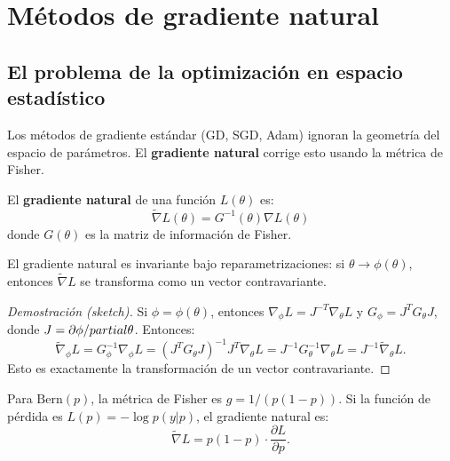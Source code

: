 \section{Métodos de gradiente natural}

\subsection{El problema de la optimización en espacio estadístico}

Los métodos de gradiente estándar (GD, SGD, Adam) ignoran la geometría del espacio de parámetros.  El \textbf{gradiente natural} corrige esto usando la métrica de Fisher.

\begin{definition}
	El \textbf{gradiente natural} de una función $L(\theta)$ es:
	\[
	\tilde{\nabla} L(\theta) = G^{-1}(\theta) \nabla L(\theta)
	\]
	donde $G(\theta)$ es la matriz de información de Fisher.
\end{definition}

\begin{theorem}
	El gradiente natural es invariante bajo reparametrizaciones: si $\theta \to \phi(\theta)$, entonces $\tilde{\nabla} L$ se transforma como un vector contravariante.
\end{theorem}

\begin{proof}[Demostración (sketch)]
	Si $\phi = \phi(\theta)$, entonces $\nabla_\phi L = J^{-T} \nabla_\theta L$ y $G_\phi = J^T G_\theta J$, donde $J = \partial\phi/\\partial\theta$.  Entonces:
	\[
	\tilde{\nabla}_\phi L = G_\phi^{-1} \nabla_\phi L = (J^T G_\theta J)^{-1} J^T \nabla_\theta L = J^{-1} G_\theta^{-1} \nabla_\theta L = J^{-1} \tilde{\nabla}_\theta L.
	\]
	Esto es exactamente la transformación de un vector contravariante.
\end{proof}

\begin{example}
	Para $\mathrm{Bern}(p)$, la métrica de Fisher es $g = 1/(p(1-p))$.  Si la función de pérdida es $L(p) = -\log p(y|p)$, el gradiente natural es:
	\[
	\tilde{\nabla} L = p(1-p) \cdot \frac{\partial L}{\partial p}.
	\]
\end{example}

\begin{center}
\end{center}

